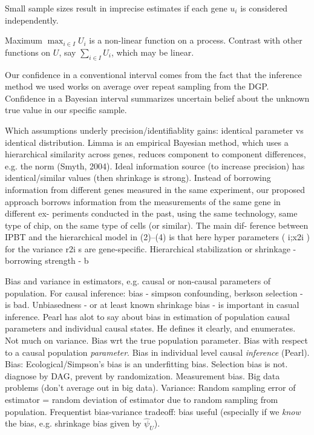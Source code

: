 \documentclass{article}
\begin{document}
Small sample sizes result in imprecise estimates if each gene $u_i$ is considered independently.
 
Maximum $\max_{i \in I}U_i$ is a non-linear function on a process. Contrast with other functions on $U$, say $\sum_{i \in I} U_i$, which may be linear.

Our confidence in a conventional interval comes from the fact that the inference method we used works on average over repeat sampling from the DGP. Confidence in a Bayesian interval summarizes uncertain belief about the unknown true value in our specific sample.

Which assumptions underly precision/identifiablity gains: identical parameter vs identical distribution. Limma is an empirical Bayesian method, which uses a hierarchical similarity across genes, reduces component to component differences, e.g. the norm (Smyth, 2004). Ideal information source (to increase precision) has identical/similar values (then shrinkage is strong). Instead of borrowing information from different genes measured in the same experiment, our proposed approach borrows information from the measurements of the same gene in different ex- periments conducted in the past, using the same technology, same type of chip, on the same type of cells (or similar). The main dif- ference between IPBT and the hierarchical model in (2)–(4) is that here hyper parameters ( i;x2i ) for the variance r2i s are gene-specific.
Hierarchical stabilization or shrinkage - borrowing strength - b

Bias and variance in estimators, e.g. causal or non-causal parameters of population. 
For causal inference: bias - simpson confounding, berkson selection - is bad.
Unbiasedness - or at least known shrinkage bias - is important in casual inference. 
Pearl has alot to say about bias in estimation of population causal parameters and individual causal states. He defines it clearly, and enumerates.
Not much on variance.
Bias wrt the true population parameter. Bias with respect to a causal population \textit{parameter}. Bias in individual level causal \textit{inference} (Pearl). 
Bias: Ecological/Simpson's bias is an underfitting bias. Selection bias is not. diagnose by DAG, prevent by randomization. Measurement bias. Big data problems (don't average out in big data).
Variance: Random sampling error of estimator = random deviation of estimator due to random sampling from population.
Frequentist bias-variance tradeoff: bias useful (especially if we \textit{know} the bias, e.g. shrinkage bias given by $\hat{\psi}_U$).
\end{document}
